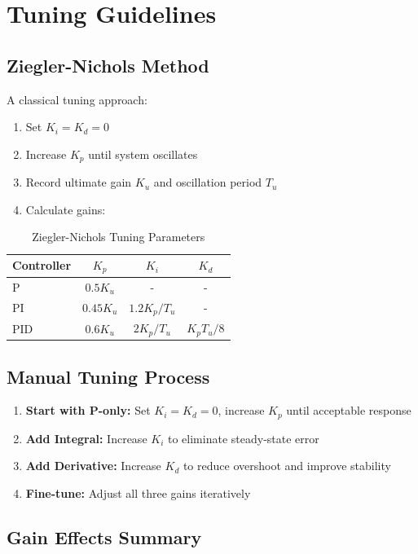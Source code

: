 \documentclass[11pt,a4paper]{article}
\begin{document}
\section{Tuning Guidelines}

\subsection{Ziegler-Nichols Method}

A classical tuning approach:

\begin{enumerate}
  \item Set $K_i = K_d = 0$
  \item Increase $K_p$ until system oscillates
  \item Record ultimate gain $K_u$ and oscillation period $T_u$
  \item Calculate gains:
\end{enumerate}

\begin{table}[h]
\centering
\begin{tabular}{lccc}
\toprule
\textbf{Controller} & $K_p$ & $K_i$ & $K_d$ \\
\midrule
P & $0.5 K_u$ & - & - \\
PI & $0.45 K_u$ & $1.2 K_p / T_u$ & - \\
PID & $0.6 K_u$ & $2 K_p / T_u$ & $K_p T_u / 8$ \\
\bottomrule
\end{tabular}
\caption{Ziegler-Nichols Tuning Parameters}
\end{table}

\subsection{Manual Tuning Process}

\begin{enumerate}
  \item \textbf{Start with P-only:} Set $K_i = K_d = 0$, increase $K_p$ until acceptable response
  \item \textbf{Add Integral:} Increase $K_i$ to eliminate steady-state error
  \item \textbf{Add Derivative:} Increase $K_d$ to reduce overshoot and improve stability
  \item \textbf{Fine-tune:} Adjust all three gains iteratively
\end{enumerate}

\subsection{Gain Effects Summary}
\end{document}
